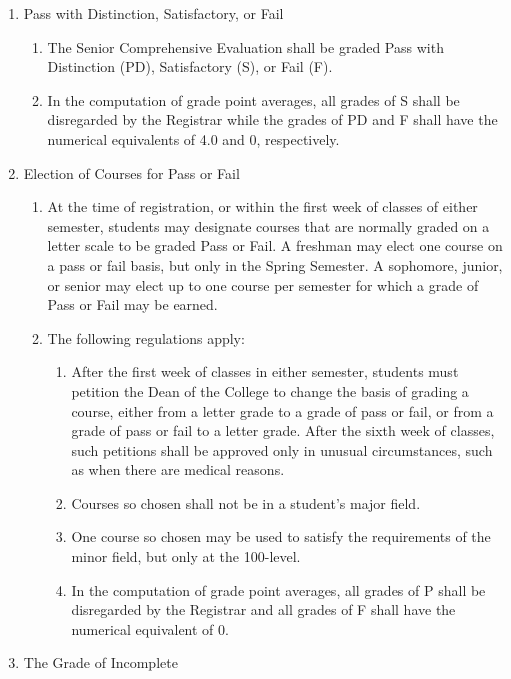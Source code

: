 \documentclass{manual}
\newcommand{\itemLevelA}{\alph*.}
\newcommand{\itemLevelB}{\arabic*)}
\newcommand{\itemLevelC}{\alph*)}
\newcommand{\itemRefA}{\alph*}
\newcommand{\itemRefB}{\arabic*}
\newcommand{\itemRefC}{\alph*}
\begin{document}
\begin{enumerate}[label=\itemLevelA,ref=\itemRefA]
\item Pass with Distinction, Satisfactory, or Fail
\begin{enumerate}[label=\itemLevelB,ref=\itemRefB]
\item The Senior Comprehensive Evaluation shall be graded Pass with Distinction (PD), Satisfactory (S), or Fail (F). 
\item In the computation of grade point averages, all grades of S shall be disregarded by the Registrar while the grades of PD and F shall have the numerical equivalents of 4.0 and 0, respectively.
\end{enumerate}

\item Election of Courses for Pass or Fail
\begin{enumerate}[label=\itemLevelB,ref=\itemRefB]

\item At the time of registration, or within the first week of classes of either semester, students may designate courses that are normally graded on a letter scale to be graded Pass or Fail. A freshman may elect one course on a pass or fail basis, but only in the Spring Semester. A sophomore, junior, or senior may elect up to one course per semester for which a grade of Pass or Fail may be earned. 

\item The following regulations apply:
\begin{enumerate}[label=\itemLevelC,ref=\itemRefC]
\item After the first week of classes in either semester, students must petition the Dean of the College to change the basis of grading a course, either from a letter grade to a grade of pass or fail, or from a grade of pass or fail to a letter grade. After the sixth week of classes, such petitions shall be approved only in unusual circumstances, such as when there are medical reasons. 

\item Courses so chosen shall not be in a student's major field. 

\item One course so chosen may be used to satisfy the requirements of the minor field, but only at the 100-level. 

\item In the computation of grade point averages, all grades of P shall be disregarded by the Registrar and all grades of F shall have the numerical equivalent of 0. 
\end{enumerate}
\end{enumerate}
\item The Grade of Incomplete


\end{enumerate}
\end{document}

